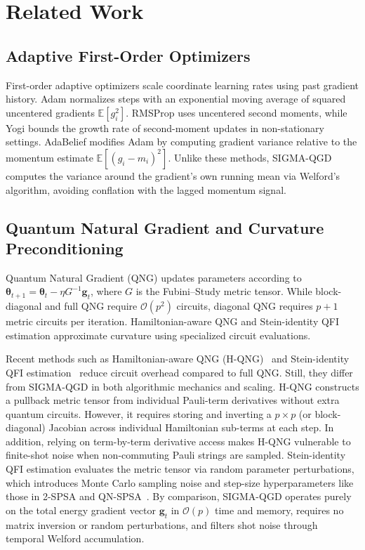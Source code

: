 \documentclass[11pt,a4paper]{article}
\begin{document}
\section{Related Work}
\label{sec:related}

\subsection{Adaptive First-Order Optimizers}
First-order adaptive optimizers scale coordinate learning rates using past gradient history. Adam \cite{kingma2014adam} normalizes steps with an exponential moving average of squared uncentered gradients $\mathbb{E}[g_i^2]$. RMSProp \cite{tieleman2012lecture} uses uncentered second moments, while Yogi \cite{zaheer2018adaptive} bounds the growth rate of second-moment updates in non-stationary settings. AdaBelief \cite{zhuang2020adabelief} modifies Adam by computing gradient variance relative to the momentum estimate $\mathbb{E}[(g_i - m_i)^2]$. Unlike these methods, SIGMA-QGD computes the variance around the gradient's own running mean via Welford's algorithm, avoiding conflation with the lagged momentum signal.

\subsection{Quantum Natural Gradient and Curvature Preconditioning}
Quantum Natural Gradient (QNG) \cite{stokes2020quantum} updates parameters according to $\boldsymbol{\theta}_{t+1} = \boldsymbol{\theta}_t - \eta G^{-1} \mathbf{g}_t$, where $G$ is the Fubini--Study metric tensor. While block-diagonal and full QNG require $\mathcal{O}(p^2)$ circuits, diagonal QNG requires $p+1$ metric circuits per iteration. Hamiltonian-aware QNG \cite{shi2025hamiltonian} and Stein-identity QFI estimation \cite{halla2025stein} approximate curvature using specialized circuit evaluations. 

Recent methods such as Hamiltonian-aware QNG (H-QNG)~\cite{shi2025hamiltonian} and Stein-identity QFI estimation~\cite{halla2025stein} reduce circuit overhead compared to full QNG. Still, they differ from SIGMA-QGD in both algorithmic mechanics and scaling. H-QNG constructs a pullback metric tensor from individual Pauli-term derivatives without extra quantum circuits. However, it requires storing and inverting a $p \times p$ (or block-diagonal) Jacobian across individual Hamiltonian sub-terms at each step. In addition, relying on term-by-term derivative access makes H-QNG vulnerable to finite-shot noise when non-commuting Pauli strings are sampled. Stein-identity QFI estimation evaluates the metric tensor via random parameter perturbations, which introduces Monte Carlo sampling noise and step-size hyperparameters like those in 2-SPSA and QN-SPSA~\cite{gacon2021simultaneous}. By comparison, SIGMA-QGD operates purely on the total energy gradient vector $\mathbf{g}_t$ in $\mathcal{O}(p)$ time and memory, requires no matrix inversion or random perturbations, and filters shot noise through temporal Welford accumulation. 
\end{document}
